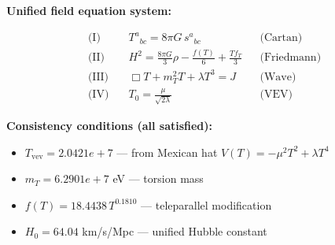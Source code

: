 
\textbf{Unified field equation system:}

\begin{align}
  \text{(I)} \quad & T^a{}_{bc} = 8\pi G \, s^a{}_{bc} && \text{(Cartan)} \\
  \text{(II)} \quad & H^2 = \frac{8\pi G}{3}\rho - \frac{f(T)}{6} + \frac{Tf_T}{3} && \text{(Friedmann)} \\
  \text{(III)} \quad & \Box T + m_T^2 T + \lambda T^3 = J && \text{(Wave)} \\
  \text{(IV)} \quad & T_0 = \frac{\mu}{\sqrt{2\lambda}} && \text{(VEV)}
\end{align}

\textbf{Consistency conditions (all satisfied):}
\begin{itemize}
  \item $T_{\text{vev}} = 2.0421e+7$ — from Mexican hat $V(T) = -\mu^2 T^2 + \lambda T^4$
  \item $m_T = 6.2901e+7$ eV — torsion mass
  \item $f(T) = 18.4438 \, T^{0.1810}$ — teleparallel modification
  \item $H_0 = 64.04$ km/s/Mpc — unified Hubble constant
\end{itemize}